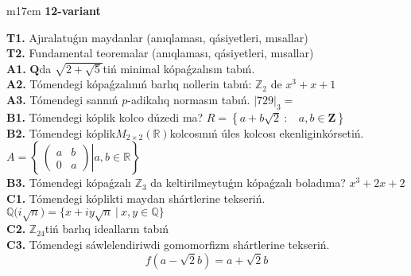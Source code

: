 \documentclass{article}
\begin{document}
\begin{tabular}{m{17cm}}
\textbf{12-variant}
\newline

\textbf{T1.} Ajıralatuǵın maydanlar (anıqlaması, qásiyetleri, mısallar) \\
\textbf{T2.} Fundamental teoremalar (anıqlaması, qásiyetleri, mısallar) \\
\textbf{A1.} \(\mathbf{Q}\)da \(\sqrt{2 + \sqrt{5}}\)tiń minimal kópaǵzalısın tabıń. \\
\textbf{A2.} Tómendegi kópaǵzalınıń barlıq nollerin tabıń: \(\mathbb{Z}_{2}\) de \(x^{3} + x + 1\) \\
\textbf{A3.} Tómendegi sannıń \(p\)-adikalıq normasın tabıń. \(|729|_{3} =\) \\
\textbf{B1.} Tómendegi kóplik kolco dúzedi ma? \(R = \left\{ a + b\sqrt{2}\ :\ \ \ \ a,b \in \mathbf{Z} \right\}\) \\
\textbf{B2.} Tómendegi kóplik\(M_{2 \times 2}\left( \mathbb{R} \right)\)kolcosınıń úles kolcosı ekenliginkórsetiń. \(A = \left\{ \left. \ \begin{pmatrix}
a & b \\
0 & a
\end{pmatrix} \right|a,b\mathbb{\in R} \right\}\) \\
\textbf{B3.} Tómendegi kópaǵzalı \(\mathbb{Z}_{3}\) da keltirilmeytuǵın kópaǵzalı boladıma? \(x^{3} + 2x + 2\) \\
\textbf{C1.} Tómendegi kóplikti maydan shártlerine tekseriń. \(\mathbb{Q(}i\sqrt{n}) = \{ x + iy\sqrt{n}\ |\ x,y \in \mathbb{Q}\}\) \\
\textbf{C2.} \(\mathbb{Z}_{24}\)tiń barlıq idealların tabıń \\
\textbf{C3.} Tómendegi sáwlelendiriwdi gomomorfizm shártlerine tekseriń.
\[f\left( a - \sqrt{2}b \right) = a + \sqrt{2}b\] \\

\end{tabular}
\vspace{1cm}
\end{document}
